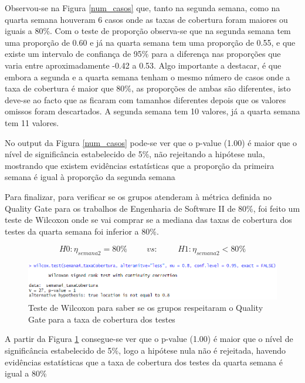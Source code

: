 \documentclass[%
 aip,
cp,  %
 amsmath,amssymb,%
 reprint,%
]{revtex4-2}
\begin{document}
Observou-se na Figura \ref{num_casos} que, tanto na segunda semana, como na quarta semana houveram 6 casos onde as taxas de cobertura foram maiores ou iguais a 80\%. Com o teste de proporção observa-se que na segunda semana tem uma proporção de 0.60 e já na quarta semana tem uma proporção de 0.55, e que existe um intervalo de confiança de 95\% para a diferença nas proporções que varia entre aproximadamente -0.42 a 0.53. Algo importante a destacar, é que embora a segunda e a quarta semana tenham o mesmo número de casos onde a taxa de cobertura é maior que 80\%, as proporções de ambas são diferentes, isto deve-se ao facto que as ficaram com tamanhos diferentes depois que os valores omissos foram descartados. A segunda semana tem 10 valores, já a quarta semana tem 11 valores.

No output da Figura  \ref{num_casos} pode-se ver que o p-value (1.00) é maior que o nível de significância estabelecido de 5\%, não rejeitando a hipótese nula, mostrando que existem evidências estatísticas que a proporção da primeira semana é igual à proporção da segunda semana

\vspace{1cm}

Para finalizar, para verificar se os grupos atenderam à métrica definida no Quality Gate para os trabalhos de Engenharia de Software II de 80\%, foi feito um teste de Wilcoxon onde se vai comprar se a mediana das taxas de cobertura dos testes da quarta semana foi inferior a 80\%.

\[ H0: \eta_{semana2} = 80\%  \hspace{1cm} vs: \hspace{1cm} H1: \eta_{semana2} < 80\% \]

\begin{figure}[!h]
    \centering
    \includegraphics[width=0.9\linewidth]{imagens//questao1/testeUmaVariavel.png}
    \caption{Teste de Wilcoxon para saber se os grupos respeitaram o Quality Gate para a taxa de cobertura dos testes}
    \label{fig:QualityGateCheck}
\end{figure}

A partir da Figura \ref{fig:QualityGateCheck} consegue-se ver que o p-value (1.00) é maior que o nível de significância estabelecido de 5\%, logo a hipótese nula não é rejeitada, havendo evidências estatísticas que a taxa de cobertura dos testes da quarta semana é igual a 80\%
\end{document}
